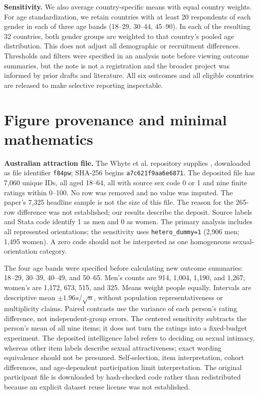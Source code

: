 \documentclass[10pt,twocolumn,letterpaper]{article}
\begin{document}
\textbf{Sensitivity.} We also average country-specific means with equal country weights. For age standardization, we retain countries with at least 20 respondents of each gender in each of three age bands (18--29, 30--44, 45--90). In each of the resulting 32 countries, both gender groups are weighted to that country's pooled age distribution. This does not adjust all demographic or recruitment differences. Thresholds and filters were specified in an analysis note before viewing outcome summaries, but the note is not a registration and the broader project was informed by prior drafts and literature. All six outcomes and all eligible countries are released to make selective reporting inspectable.

\section{Figure provenance and minimal mathematics}

\textbf{Australian attraction file.} The Whyte et al. repository \citep{whyte2021} supplies , downloaded as file identifier \texttt{f84pw}; SHA-256 begins \texttt{a7c621f9aa6e6871}. The deposited file has 7,060 unique IDs, all aged 18--64, all with source sex code 0 or 1 and nine finite ratings within 0--100. No row was removed and no value was imputed. The paper's 7,325 headline sample is not the size of this file. The reason for the 265-row difference was not established; our results describe the deposit. Source labels and Stata code identify 1 as men and 0 as women. The primary analysis includes all represented orientations; the sensitivity uses \texttt{hetero\_dummy=1} (2,906 men; 1,495 women). A zero code should not be interpreted as one homogeneous sexual-orientation category.

The four age bands were specified before calculating new outcome summaries: 18--29, 30--39, 40--49, and 50--65. Men's counts are 914, 1,004, 1,190, and 1,267; women's are 1,172, 673, 515, and 325. Means weight people equally. Intervals are descriptive mean $\pm1.96s/\sqrt n$, without population representativeness or multiplicity claims. Paired contrasts use the variance of each person's rating difference, not independent-group errors. The centered sensitivity subtracts the person's mean of all nine items; it does not turn the ratings into a fixed-budget experiment. The deposited intelligence label refers to deciding on sexual intimacy, whereas other item labels describe sexual attractiveness; exact wording equivalence should not be presumed. Self-selection, item interpretation, cohort differences, and age-dependent participation limit interpretation. The original participant file is downloaded by hash-checked code rather than redistributed because an explicit dataset reuse license was not established.
\end{document}
